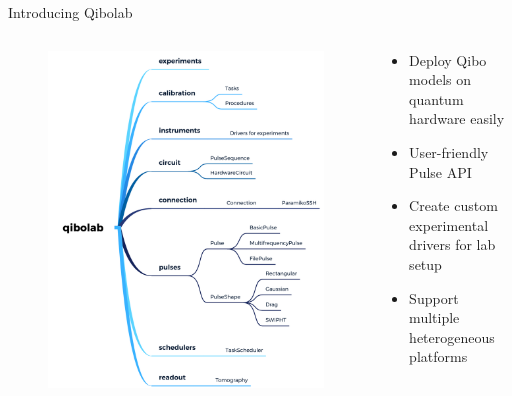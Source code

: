 \documentclass[11pt]{beamer}
\begin{document}
\begin{frame}{Introducing Qibolab}
    \begin{columns}
        \begin{column}[]{0.5 \textwidth}
            \begin{figure}
                \includegraphics[height=0.8\textheight]{figures/qibolab.png}
            \end{figure}
            
        \end{column}

        \begin{column}[]{0.5 \textwidth}
            \begin{tcolorbox}[colframe=gray,title=Qibolab features:]
                \begin{itemize}
                    \item Deploy Qibo models on quantum hardware easily
                    \item User-friendly Pulse API
                    \item Create custom experimental drivers for lab setup
                    \item Support multiple heterogeneous platforms
                \end{itemize}
                \end{tcolorbox}
        \end{column}
    \end{columns}
\end{frame}
\end{document}
